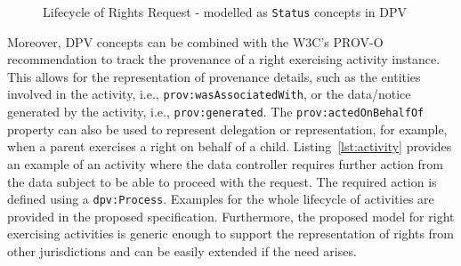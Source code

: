 \documentclass{IOS-Book-Article}     %
\begin{document}
\begin{figure}[ht]
\caption{Lifecycle of Rights Request - modelled as \texttt{Status} concepts in DPV \cite{pandit2024dpv}}
\label{fig:status}
\centering
{}
\end{figure}

Moreover, DPV concepts can be combined with the W3C's PROV-O recommendation to track the provenance of a right exercising activity instance.
This allows for the representation of provenance details, such as the entities involved in the activity, i.e., \texttt{prov:wasAssociatedWith}, or the data/notice generated by the activity, i.e., \texttt{prov:generated}. The \texttt{prov:actedOnBehalfOf} property can also be used to represent delegation or representation, for example, when a parent exercises a right on behalf of a child.
Listing~\ref{lst:activity} provides an example of an activity where the data controller requires further action from the data subject to be able to proceed with the request. The required action is defined using a \texttt{dpv:Process}.
Examples for the whole lifecycle of activities are provided in the proposed specification.
Furthermore, the proposed model for right exercising activities is generic enough to support the representation of rights from other jurisdictions and can be easily extended if the need arises.
\end{document}
